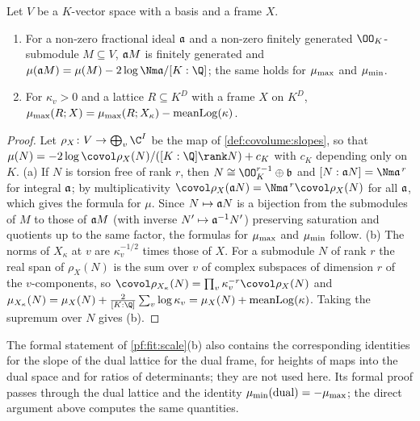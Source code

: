 \begin{lemma}[Scalings]\label{pf:fit:scale}
Let $V$ be a $K$-vector space with a basis and a frame $X$.
\begin{enumerate}[label=(\alph*)]
\item For a non-zero fractional ideal $\mathfrak{a}$ and a non-zero finitely generated $\OO_K$-submodule $M\subseteq V$,
$\mathfrak{a} M$ is finitely generated and $\mu(\fitden M)=\mu(M)-2\log\Nm\fitden/[K:\Q]$; the same holds for $\mu_{\max}$
and $\mu_{\min}$.
\item For $\kappa_v>0$ and a lattice $R\subseteq K^D$ with a frame $X$ on $K^D$,
$\mu_{\max}(R;X)=\mu_{\max}(R;X_\kappa)-\operatorname{meanLog}(\kappa)$.
\end{enumerate}
\end{lemma}

\begin{proof}
Let $\rho_X\colon V\to\bigoplus_v\C^I$ be the map of \cref{def:covolume:slopes}, so that
$\mu(N)=-2\log\covol\rho_X(N)/([K:\Q]\rank N)+c_K$ with $c_K$ depending only on $K$. (a) If $N$ is torsion free of rank
$r$, then $N\cong\OO_K^{r-1}\oplus\mathfrak b$ and $[N:\fitden N]=\Nm\fitden^{\,r}$ for integral $\mathfrak{a}$; by
multiplicativity $\covol\rho_X(\fitden N)=\Nm\fitden^{\,r}\covol\rho_X(N)$ for all $\mathfrak{a}$, which gives the formula for
$\mu$. Since $N\mapsto\mathfrak{a} N$ is a bijection from the submodules of $M$ to those of $\mathfrak{a} M$ (with inverse
$N'\mapsto\mathfrak{a}^{-1}N'$) preserving saturation and quotients up to the same factor, the formulas for $\mu_{\max}$ and
$\mu_{\min}$ follow. (b) The norms of $X_\kappa$ at $v$ are $\kappa_v^{-1/2}$ times those of $X$. For a submodule $N$ of
rank $r$ the real span of $\rho_X(N)$ is the sum over $v$ of complex subspaces of dimension $r$ of the $v$-components,
so $\covol\rho_{X_\kappa}(N)=\prod_v\kappa_v^{-r}\covol\rho_X(N)$ and
$\mu_{X_\kappa}(N)=\mu_X(N)+\frac2{[K:\Q]}\sum_v\log\kappa_v=\mu_X(N)+\fitmlog(\kappa)$. Taking the supremum over $N$
gives (b).
\end{proof}

\begin{remark}\label{pf:fit:rem:kappa}
The formal statement of \cref{pf:fit:scale}(b) also contains the corresponding identities for the slope of the dual
lattice for the dual frame, for heights of maps into the dual space and for ratios of determinants; they are not used
here. Its formal proof passes through the dual lattice and the identity
$\mu_{\min}(\text{dual})=-\mu_{\max}$; the direct argument above computes the same quantities.
\end{remark}

